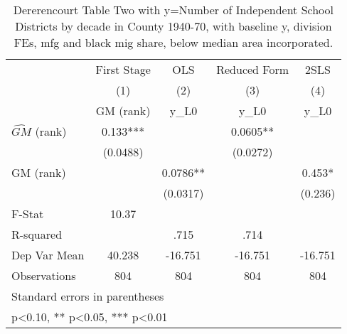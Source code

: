 \begin{table}[htbp]\centering
\def\sym#1{\ifmmode^{#1}\else\(^{#1}\)\fi}
\caption{Dererencourt Table Two with y=Number of Independent School Districts by decade in County 1940-70, with baseline y, division FEs, mfg and black mig share, below median area incorporated.}
\begin{tabular}{l*{4}{c}}
\toprule
                    & First Stage   &         OLS   &Reduced Form   &        2SLS   \\
                    &\multicolumn{1}{c}{(1)}&\multicolumn{1}{c}{(2)}&\multicolumn{1}{c}{(3)}&\multicolumn{1}{c}{(4)}\\
                    &\multicolumn{1}{c}{GM  (rank)}&\multicolumn{1}{c}{y\_L0}&\multicolumn{1}{c}{y\_L0}&\multicolumn{1}{c}{y\_L0}\\
\midrule
$\hat{GM}$ (rank)   &       0.133***&               &      0.0605** &               \\
                    &    (0.0488)   &               &    (0.0272)   &               \\
\addlinespace
GM  (rank)          &               &      0.0786** &               &       0.453*  \\
                    &               &    (0.0317)   &               &     (0.236)   \\
\midrule
F-Stat              &       10.37   &               &               &               \\
R-squared           &               &        .715   &        .714   &               \\
Dep Var Mean        &      40.238   &     -16.751   &     -16.751   &     -16.751   \\
Observations        &         804   &         804   &         804   &         804   \\
\bottomrule
\multicolumn{5}{l}{\footnotesize Standard errors in parentheses}\\
\multicolumn{5}{l}{\footnotesize * p<0.10, ** p<0.05, *** p<0.01}\\
\end{tabular}
\end{table}
